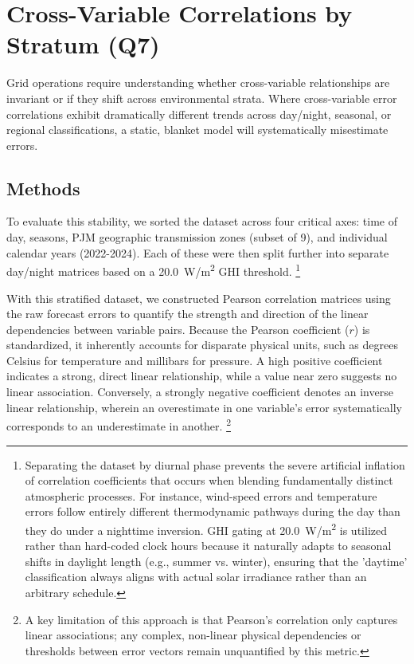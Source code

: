 \section{Cross-Variable Correlations by Stratum (Q7)}\label{sec:strata_cross}

Grid operations require understanding whether cross-variable relationships are invariant or if they shift across environmental strata. Where cross-variable error correlations exhibit dramatically different trends across day/night, seasonal, or regional classifications, a static, blanket model will systematically misestimate errors.

\subsection{Methods}
To evaluate this stability, we sorted the dataset across four critical axes: time of day, seasons, PJM geographic transmission zones (subset of 9), and individual calendar years (2022-2024). Each of these were then split further into separate day/night matrices based on a \SI{20.0}{W/m^2} GHI threshold.
\raggedbottom
\footnote{Separating the dataset by diurnal phase prevents the severe artificial inflation of correlation coefficients that occurs when blending fundamentally distinct atmospheric processes. For instance, wind-speed errors and temperature errors follow entirely different thermodynamic pathways during the day than they do under a nighttime inversion. GHI gating at \SI{20.0}{W/m^2} is utilized rather than hard-coded clock hours because it naturally adapts to seasonal shifts in daylight length (e.g., summer vs. winter), ensuring that the 'daytime' classification always aligns with actual solar irradiance rather than an arbitrary schedule. }
\flushbottom

With this stratified dataset, we constructed Pearson correlation matrices using the raw forecast errors to quantify the strength and direction of the linear dependencies between variable pairs. Because the Pearson coefficient ($r$) is standardized, it inherently accounts for disparate physical units, such as degrees Celsius for temperature and millibars for pressure. A high positive coefficient indicates a strong, direct linear relationship, while a value near zero suggests no linear association. Conversely, a strongly negative coefficient denotes an inverse linear relationship, wherein an overestimate in one variable's error systematically corresponds to an underestimate in another.
\raggedbottom
\footnote{A key limitation of this approach is that Pearson’s correlation only captures linear associations; any complex, non-linear physical dependencies or thresholds between error vectors remain unquantified by this metric.}
\flushbottom


